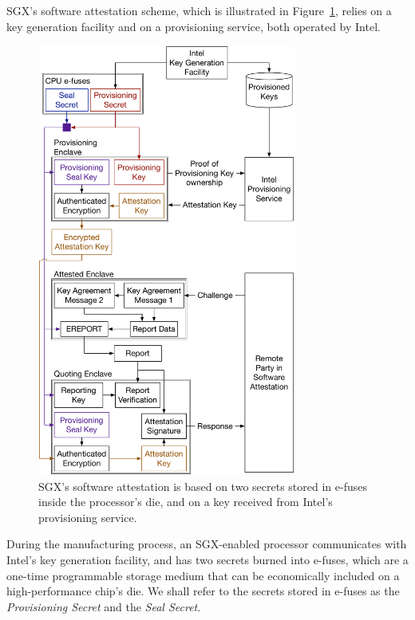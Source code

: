
SGX's software attestation scheme, which is illustrated in
Figure~\ref{fig:sgx_attestation_keys}, relies on a key generation facility and
on a provisioning service, both operated by Intel.

\begin{figure}[hbt]
  \centering
  \includegraphics[width=85mm]{figures/sgx_attestation_keys.pdf}
  \caption{
    SGX's software attestation is based on two secrets stored in e-fuses inside
    the processor's die, and on a key received from Intel's provisioning
    service.
  }
  \label{fig:sgx_attestation_keys}
\end{figure}

During the manufacturing process, an SGX-enabled processor communicates with
Intel's key generation facility, and has two secrets burned into e-fuses, which
are a one-time programmable storage medium that can be economically included on
a high-performance chip's die. We shall refer to the secrets stored in e-fuses
as the \textit{Provisioning Secret} and the \textit{Seal Secret}.

